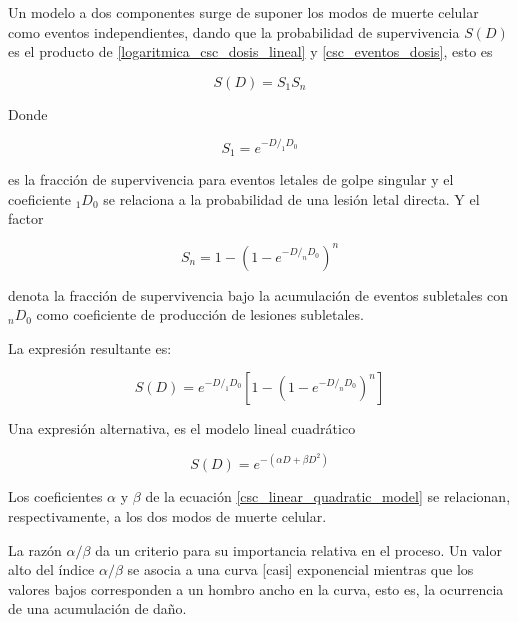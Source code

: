 \documentclass[12pt,letterpaper, oneside]{book}
\begin{document}
			Un modelo a dos componentes surge de suponer los modos de muerte celular como eventos independientes, dando que la probabilidad de supervivencia $S(D)$ es el producto de \ref{logaritmica_csc_dosis_lineal} y \ref{csc_eventos_dosis}\cite{Tubiana.1990}, esto es
			
			$$S(D)=S_1S_n$$
			
			Donde 
			
			$$S_1=e^{-D/_1D_0}$$
			
			es la fracción de supervivencia para eventos letales de golpe singular y el coeficiente $_1D_0$ se relaciona a la probabilidad de una lesión letal directa. Y el factor
			
			$$S_n=1-(1-e^{-D/_nD_0})^n$$
			
			denota la fracción de supervivencia bajo la acumulación de eventos subletales con $_nD_0$ como coeficiente de producción de lesiones subletales. 
			
			La expresión resultante es:
			
			\begin{equation}
				S(D)=e^{-D/_1D_0}\left[1-(1-e^{-D/_nD_0})^n\right]\label{csc_onehitlethal_nsublethal}
			\end{equation}
			
			Una expresión alternativa, es el modelo lineal cuadrático
			
			\begin{equation}
				S(D)=e^{-(\alpha D + \beta D^2)}\label{csc_linear_quadratic_model}
			\end{equation}
			
			Los coeficientes $\alpha$ y $\beta$ de la ecuación \ref{csc_linear_quadratic_model} se relacionan, respectivamente, a los dos modos de muerte celular. 
			
			La razón $\alpha/\beta$ da un criterio para su importancia relativa en el proceso\cite{Tubiana.1990}. Un valor alto del índice $\alpha/\beta$ se asocia a una curva [casi] exponencial mientras que los valores bajos corresponden a un hombro ancho en la curva\cite{Tubiana.1990}, esto es, la ocurrencia de una acumulación de daño.
			
			
\end{document}
